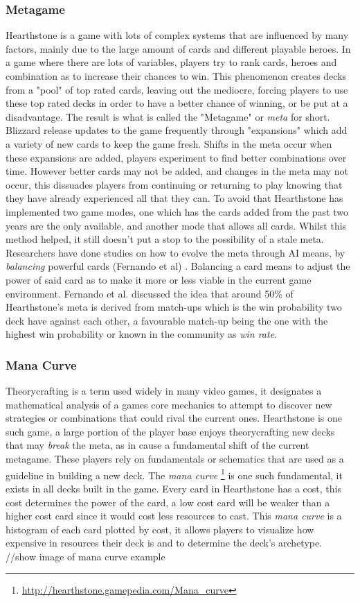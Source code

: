 \documentclass{report}
\begin{document}
	\subsubsection{Metagame}
	Hearthstone is a game with lots of complex systems that are influenced by many factors, mainly due to the large amount of cards and different playable heroes. In a game where there are lots of variables, players try to rank cards, heroes and combination as to increase their chances to win. This phenomenon creates decks from a "pool" of top rated cards, leaving out the mediocre, forcing players to use these top rated decks in order to have a better chance of winning, or be put at a disadvantage. The result is what is called the "Metagame" or {\it{meta}} for short. Blizzard release updates to the game frequently through "expansions" which add a variety of new cards to keep the game fresh. Shifts in the meta occur when these expansions are added, players experiment to find better combinations over time. However better cards may not be added, and changes in the meta may not occur, this dissuades players from continuing or returning to play knowing that they have already experienced all that they can. To avoid that Hearthstone has implemented two game modes, one which has the cards added from the past two years are the only available, and another mode that allows all cards. Whilst this method helped, it still doesn't put a stop to the possibility of a stale meta. Researchers have done studies on how to evolve the meta through AI means, by {\it{balancing}} powerful cards ({Fernando et al}) \cite{EvolveMeta}. Balancing a card means to adjust the power of said card as to make it more or less viable in the current game environment. Fernando et al. discussed the idea that around 50\% of Hearthstone's meta is derived from match-ups which is the win probability two deck have against each other, a favourable match-up being the one with the highest win probability or known in the community as {\it{win rate}}.  
\subsubsection{Mana Curve}
	Theorycrafting is a term used widely in many video games, it designates a mathematical analysis of a games core mechanics to attempt to discover new strategies or combinations that could rival the current ones. Hearthstone is one such game, a large portion of the player base enjoys theorycrafting new decks that may {\it{break}} the meta, as in cause a fundamental shift of the current metagame. These players rely on fundamentals or schematics that are used as a guideline in building a new deck. The {\it{mana curve}} \footnote{\url{http://hearthstone.gamepedia.com/Mana_curve}} is one such fundamental, it exists in all decks built in the game. Every card in Hearthstone has a cost, this cost determines the power of the card, a low cost card will be weaker than a higher cost card since it would cost less resources to cast. This {\it{mana curve}} is a histogram of each card plotted by cost, it allows players to visualize how expensive in resources their deck is and to determine the deck's archetype. //show image of mana curve example
\end{document}
